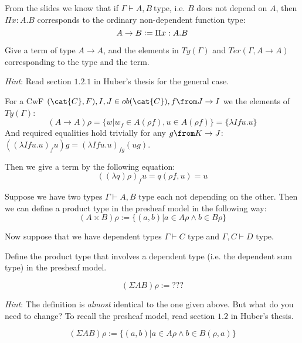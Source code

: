\begin{exercise}
  From the slides we know that if $\Gamma \vdash A, B ~\text{type}$, i.e. $B$
  does not depend on $A$, then $\Pi x: A. B$ corresponds to the ordinary
  non-dependent function type:
  \begin{equation*}
    A \to B \vcentcolon= \Pi x: A. B
  \end{equation*}

  Give a term of type $A \to A$, and the elements in $\mathit{Ty}(\Gamma)$ and
  $\mathit{Ter}(\Gamma, A \to A)$ corresponding to the type and the term.

  \emph{Hint}: Read section $1.2.1$ in Huber's thesis for the general case.
\end{exercise}
\begin{answer}
  For a CwF $(\cat{C}, F), I, J \in ob(\cat{C}), f \from J \to I$ we the elements of $\mathit{Ty}(\Gamma)$:
  \[
    (A \to A)\rho = \{w | w_f \in A(\rho f), u \in A(\rho f)\} = \{\lambda I f u.u\}
  \]
  And required equalities hold trivially for any $g \from K \to J$: $((\lambda
  I f u.u)_f u) g = (\lambda I f u.u)_{fg} (ug)$.

  Then we give a term by the following equation:
  \[
    ((\lambda q) \rho)_f u = q(\rho f, u) = u
  \]
\end{answer}

\begin{exercise}
  Suppose we have two types $\Gamma \vdash A,B \text{ type}$ each not depending
  on the other.  Then we can define a product type in the presheaf model in the
  following way:
  \[
    (A \times B)\rho := \{(a,b) | a \in A\rho \land b \in B\rho\}
  \]

  Now suppose that we have dependent types $\Gamma \vdash C \text{ type}$ and
  $\Gamma, C \vdash D \text{ type}$.

  Define the product type that involves a dependent type (i.e. the dependent
  sum type) in the presheaf model.

  \[
    (\Sigma AB)\rho := ???
  \]

  \emph{Hint}: The definition is \emph{almost} identical to the one given
  above. But what do you need to change? To recall the presheaf model, read
  section $1.2$ in Huber's thesis.
\end{exercise}
\begin{answer}
  \[
    (\Sigma AB)\rho := \{(a,b) | a \in A\rho \land b \in B(\rho, a)\}
  \]
\end{answer}

